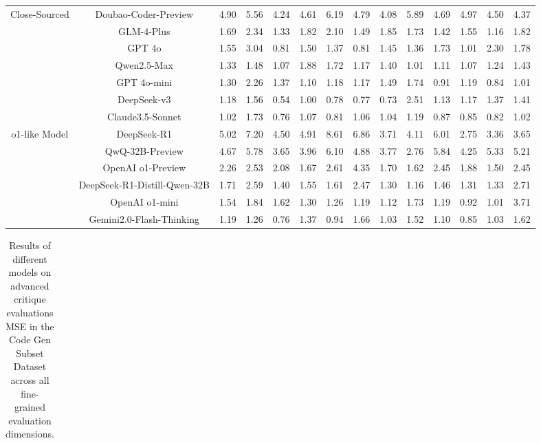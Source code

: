 \documentclass[11pt, a4paper, logo, copyright, nonumbering, amsart]{map}
\begin{document}
\begin{CJK*}{UTF8}{gbsn}
\begin{table*}[h!]
\begin{adjustbox}{width=\textwidth}
\begin{tabular}{c|c|cccccccccccc}
    \midrule
    \multirow{7}{*}{Close-Sourced}
    & Doubao-Coder-Preview & 4.90 & 5.56 & 4.24 & 4.61 & 6.19 & 4.79 & 4.08 & 5.89 & 4.69 & 4.97 & 4.50 & 4.37 \\
    & GLM-4-Plus & 1.69 & 2.34 & 1.33 & 1.82 & 2.10 & 1.49 & 1.85 & 1.73 & 1.42 & 1.55 & 1.16 & 1.82 \\
    & GPT 4o & 1.55 & 3.04 & 0.81 & 1.50 & 1.37 & 0.81 & 1.45 & 1.36 & 1.73 & 1.01 & 2.30 & 1.78 \\
    & Qwen2.5-Max & 1.33 & 1.48 & 1.07 & 1.88 & 1.72 & 1.17 & 1.40 & 1.01 & 1.11 & 1.07 & 1.24 & 1.43 \\
    & GPT 4o-mini & 1.30 & 2.26 & 1.37 & 1.10 & 1.18 & 1.17 & 1.49 & 1.74 & 0.91 & 1.19 & 0.84 & 1.01 \\
    & DeepSeek-v3 & 1.18 & 1.56 & 0.54 & 1.00 & 0.78 & 0.77 & 0.73 & 2.51 & 1.13 & 1.17 & 1.37 & 1.41 \\
    & Claude3.5-Sonnet & 1.02 & 1.73 & 0.76 & 1.07 & 0.81 & 1.06 & 1.04 & 1.19 & 0.87 & 0.85 & 0.82 & 1.02 \\

    \midrule
    \multirow{6}{*}{o1-like Model} 
    & DeepSeek-R1 & 5.02 & 7.20 & 4.50 & 4.91 & 8.61 & 6.86 & 3.71 & 4.11 & 6.01 & 2.75 & 3.36 & 3.65 \\
    & QwQ-32B-Preview & 4.67 & 5.78 & 3.65 & 3.96 & 6.10 & 4.88 & 3.77 & 2.76 & 5.84 & 4.25 & 5.33 & 5.21 \\
    & OpenAI o1-Preview & 2.26 & 2.53 & 2.08 & 1.67 & 2.61 & 4.35 & 1.70 & 1.62 & 2.45 & 1.88 & 1.50 & 2.45 \\
    & DeepSeek-R1-Distill-Qwen-32B & 1.71 & 2.59 & 1.40 & 1.55 & 1.61 & 2.47 & 1.30 & 1.16 & 1.46 & 1.31 & 1.33 & 2.71 \\
    & OpenAI o1-mini & 1.54 & 1.84 & 1.62 & 1.30 & 1.26 & 1.19 & 1.12 & 1.73 & 1.19 & 0.92 & 1.01 & 3.71 \\
    & Gemini2.0-Flash-Thinking & 1.19 & 1.26 & 0.76 & 1.37 & 0.94 & 1.66 & 1.03 & 1.52 & 1.10 & 0.85 & 1.03 & 1.62 \\
    \bottomrule
    \end{tabular}
    \end{adjustbox}
\end{table*}

\begin{table*}[h!]
    \centering
    \caption{Results of different models on advanced critique evaluations MSE in the Code Gen Subset Dataset across all fine-grained evaluation dimensions.} \label{table:algo_level2_all_dim}
    \begin{adjustbox}{width=\textwidth}
    \begin{tabular}{c|c|cccccccccc}
    

\end{tabular}
\end{adjustbox}
\end{table*}
\end{CJK*}
\end{document}

